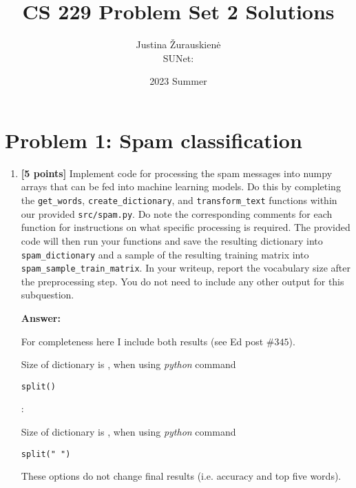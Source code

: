 \documentclass{article}
\title{CS 229 Problem Set 2 Solutions}
\author{Justina \v{Z}urauskien\.{e} \\ SUNet:}
\date{2023 Summer}
\begin{document}
\maketitle

\section*{Problem 1: Spam classification}

\begin{enumerate}[label=\alph*)]
    \item \textbf{[5 points]} Implement code for processing the spam messages into numpy arrays that can
be fed into machine learning models. Do this by completing the \texttt{get\_words}, \texttt{create\_dictionary},
and \texttt{transform\_text} functions within our provided \texttt{src/spam.py}. Do note the corresponding
comments for each function for instructions on what specific processing is required.
The provided code will then run your functions and save the resulting dictionary into
\texttt{spam\_dictionary} and a sample of the resulting training matrix into
\texttt{spam\_sample\_train\_matrix}. In your writeup, report the vocabulary size after the preprocessing
step. You do not need to include any other output for this subquestion.

\textbf{Answer:}

For completeness here I include both results (see Ed post $\#345$).

Size of dictionary is , when using \emph{python} command
\begin{verbatim} 
split()
\end{verbatim}: 

Size of dictionary is , when using \emph{python} command
\begin{verbatim}
split(" ")
\end{verbatim}

These options do not change final results (i.e. accuracy and top five words).



\end{enumerate}
\end{document}
